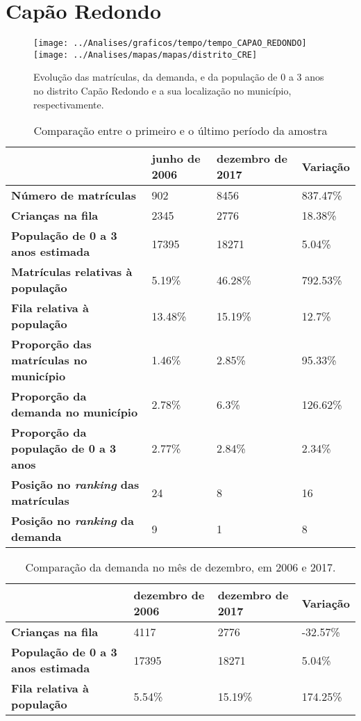 \section{Capão Redondo}
\begin{figure}[H]
	\centering
	\texttt{[image: ../Analises/graficos/tempo/tempo\_CAPAO\_REDONDO]}
	\texttt{[image: ../Analises/mapas/mapas/distrito\_CRE]}
	\caption{Evolução das matrículas, da demanda, e da população de 0 a 3 anos no distrito Capão Redondo e a sua localização no município, respectivamente.}
\end{figure}
\begin{table}[H]
	\begin{tabular}{|l|l|l|l|}
		\hline
		\textbf{}                                      & \textbf{junho de 2006}       & \textbf{dezembro de 2017}    & \textbf{Variação} \\ \hline
		\textbf{Número de matrículas}                  & 902 & 8456 & 837.47\% \\ \hline
		\textbf{Crianças na fila}                      & 2345 & 2776 & 18.38\% \\ \hline
		\textbf{População de 0 a 3 anos estimada}      & 17395 & 18271 & 5.04\% \\ \hline
		\textbf{Matrículas relativas à população}      & 5.19\% & 46.28\% & 792.53\% \\ \hline
		\textbf{Fila relativa à população}             & 13.48\% & 15.19\% & 12.7\% \\ \hline
		\textbf{Proporção das matrículas no município} & 1.46\% & 2.85\% & 95.33\% \\ \hline
		\textbf{Proporção da demanda no município}     & 2.78\% & 6.3\% & 126.62\% \\ \hline
		\textbf{Proporção da população de 0 a 3 anos}  & 2.77\% & 2.84\% & 2.34\% \\ \hline
		\textbf{Posição no \textit{ranking} das matrículas}     & 24 & 8 & 16 \\ \hline
		\textbf{Posição no \textit{ranking} da demanda}         & 9 & 1 & 8 \\ \hline
	\end{tabular}
	\caption{Comparação entre o primeiro e o último período da amostra}
\end{table}
\begin{table}[H]
	\begin{tabular}{|l|l|l|l|}
		\hline
		\textbf{}                                 & \textbf{dezembro de 2006} & \textbf{dezembro de 2017} & \textbf{Variação} \\ \hline
		\textbf{Crianças na fila}                      & 4117 & 2776 & -32.57\% \\ \hline
		\textbf{População de 0 a 3 anos estimada}      & 17395 & 18271 & 5.04\% \\ \hline
		\textbf{Fila relativa à população}             & 5.54\% & 15.19\% & 174.25\% \\ \hline
	\end{tabular}
	\caption{Comparação da demanda no mês de dezembro, em 2006 e 2017.}
\end{table}
